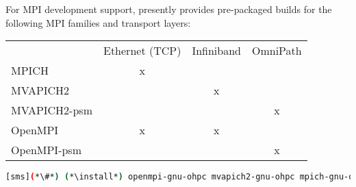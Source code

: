 For MPI development support, \OHPC{} presently provides pre-packaged builds for
the following MPI families and transport layers: 

\begin{table}[]
\centering
\begin{tabular}{llll}
             & Ethernet (TCP)        & Infiniband            & OmniPath              \\
MPICH        & \multicolumn{1}{c}{x} &                       &                       \\
MVAPICH2     &                       & \multicolumn{1}{c}{x} &                       \\
MVAPICH2-psm &                       &                       & \multicolumn{1}{c}{x} \\
OpenMPI      & \multicolumn{1}{c}{x} & \multicolumn{1}{c}{x} &                       \\
OpenMPI-psm  &                       &                       & \multicolumn{1}{c}{x}
\end{tabular}
\end{table}

\begin{lstlisting}[language=bash]
[sms](*\#*) (*\install*) openmpi-gnu-ohpc mvapich2-gnu-ohpc mpich-gnu-ohpc
\end{lstlisting}
